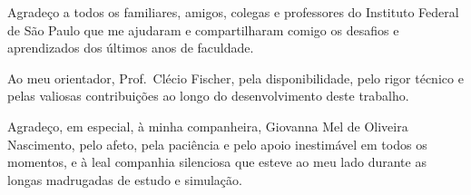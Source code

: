 \begin{agradecimentos}
Agradeço a todos os familiares, amigos, colegas e professores do Instituto
Federal de São Paulo que me ajudaram e compartilharam comigo os desafios e
aprendizados dos últimos anos de faculdade.

Ao meu orientador, Prof.~Clécio Fischer, pela disponibilidade, pelo rigor
técnico e pelas valiosas contribuições ao longo do desenvolvimento deste
trabalho.

Agradeço, em especial, à minha companheira, Giovanna Mel de Oliveira
Nascimento, pelo afeto, pela paciência e pelo apoio inestimável em todos os
momentos, e à leal companhia silenciosa que esteve ao meu lado durante as
longas madrugadas de estudo e simulação.
\end{agradecimentos}
